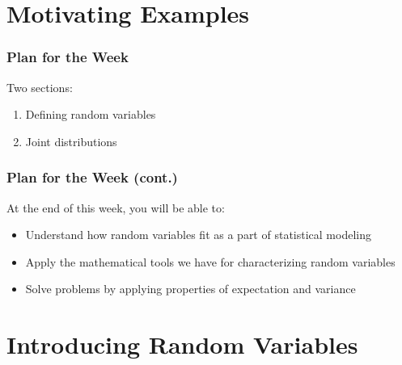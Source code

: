\documentclass[12pt, block=fill]{beamer}
\begin{document}
\section{Motivating Examples}

\begin{frame}
  \frametitle{Plan for the Week}
  Two sections:
  \begin{enumerate}
  \item Defining random variables
  \item Joint distributions
  \end{enumerate}

    
      
\end{frame}

\begin{frame}
  \frametitle{Plan for the Week (cont.)}
  At the end of this week, you will be able to:
  \begin{itemize}
  \item Understand how random variables fit as a part of statistical
    modeling
  \item Apply the mathematical tools we have for characterizing random
    variables
  \item Solve problems by applying properties of expectation and
    variance
  \end{itemize}
  \note[item]{}
\end{frame}

\section{Introducing Random Variables}
\end{document}
